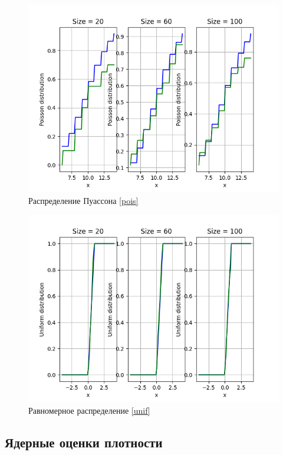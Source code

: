 \documentclass[a4paper]{article}
\begin{document}
        \begin{figure}[H]
            \centering
            \includegraphics[scale = 0.4]{poisson_distrib.png}
            \caption{Распределение Пуассона \eqref{pois}}
            \label{fig:poisson}
        \end{figure}
        
        \begin{figure}[H]
            \centering
            \includegraphics[scale = 0.4]{unifrom_distrib.png}
            \caption{Равномерное распределение \eqref{unif}}
            \label{fig:uniform}
        \end{figure}
        
    \subsection{Ядерные оценки плотности}
    
\end{document}
